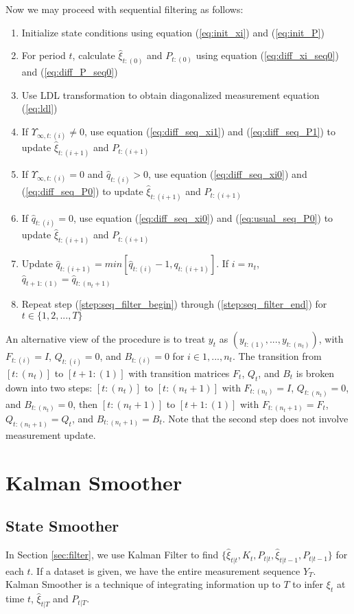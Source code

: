 \documentclass[10pt]{article}
\newenvironment{boenumerate}
    {\begin{enumerate}\renewcommand\labelenumi{\textbf\theenumi}}
    {\end{enumerate}}
\numberwithin{equation}{section}
\begin{document}
Now we may proceed with sequential filtering as follows:
\begin{boenumerate}
    \item Initialize state conditions using equation (\ref{eq:init_xi}) and (\ref{eq:init_P}) 
    \item For period $t$, calculate $\hat{\xi}_{t:(0)}$ and $P_{t:{(0)}}$ using equation (\ref{eq:diff_xi_seq0}) and (\ref{eq:diff_P_seq0}) \label{step:seq_filter_begin}
    \item Use LDL transformation to obtain diagonalized measurement equation (\ref{eq:ldl})
    \item If $\Upsilon_{\infty,t:(i)}\neq0$, use equation (\ref{eq:diff_seq_xi1}) and (\ref{eq:diff_seq_P1}) to update $\hat{\xi}_{t:(i+1)}$ and $P_{t:(i+1)}$
    \item If $\Upsilon_{\infty,t:(i)}=0$ and $\hat{q}_{t:(i)}>0$, use equation (\ref{eq:diff_seq_xi0}) and (\ref{eq:diff_seq_P0}) to update $\hat{\xi}_{t:(i+1)}$ and $P_{t:(i+1)}$ 
    \item If $\hat{q}_{t:(i)}=0$, use equation (\ref{eq:diff_seq_xi0}) and (\ref{eq:usual_seq_P0}) to update $\hat{\xi}_{t:(i+1)}$ and $P_{t:(i+1)}$ 
    \item Update $\hat{q}_{t:(i+1)} = min[\hat{q}_{t:(i)}-1, q_{t:(i+1)}]$. If $i=n_t$, $\hat{q}_{t+1:(1)}=\hat{q}_{t:(n_t+1)}$ \label{step:seq_filter_end}
    \item Repeat step (\ref{step:seq_filter_begin}) through (\ref{step:seq_filter_end}) for $t\in\{1,2,...,T\}$
\end{boenumerate}

An alternative view of the procedure is to treat $y_t$ as $(y_{t:(1)},...,y_{t:(n_t)})$, with $F_{t:(i)}=I$, $Q_{t:(i)}=0$, and $B_{t:(i)}=0$ for $i\in{1,...,n_t}$. The transition from $[t:(n_t)]$ to $[t+1:(1)]$ with transition matrices $F_t$, $Q_t$, and $B_t$ is broken down into two steps: $[t:(n_t)]$ to $[t:(n_t+1)]$ with $F_{t:(n_t)}=I$, $Q_{t:(n_t)}=0$, and $B_{t:(n_t)}=0$, then $[t:(n_t+1)]$ to $[t+1:(1)]$ with $F_{t:(n_t+1)}=F_t$, $Q_{t:(n_t+1)}=Q_t$, and $B_{t:(n_t+1)}=B_t$. Note that the second step does not involve measurement update.

\section{Kalman Smoother} \label{sec:smoother}
\subsection{State Smoother}
In Section \ref{sec:filter}, we use Kalman Filter to find $\{\hat{\xi}_{t|t}, K_t, P_{t|t}, \hat{\xi}_{t|t-1}, P_{t|t-1}\}$ for each $t$. If a dataset is given, we have the entire measurement sequence $Y_T$. Kalman Smoother is a technique of integrating information up to $T$ to infer $\xi_t$ at time $t$, $\hat{\xi}_{t|T}$ and $P_{t|T}$. 
\end{document}
